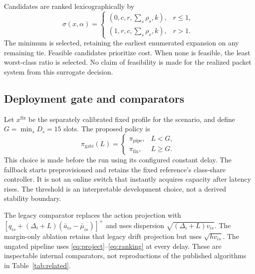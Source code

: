 \documentclass[10pt,a4paper]{article}
\begin{document}
Candidates are ranked lexicographically by
\begin{equation}
 \sigma(x,\alpha)=
 \begin{cases}
 (0,c,r,\sum_s\rho_s,k), & r\le1,\\
 (1,r,c,\sum_s\rho_s,k), & r>1.
 \end{cases}\label{eq:ranking}
\end{equation}
The minimum is selected, retaining the earliest enumerated expansion on any
remaining tie. Feasible candidates prioritize cost. When none is feasible,
the least worst-class ratio is selected. No claim of feasibility is made for
the realized packet system from this surrogate decision.

\subsection{Deployment gate and comparators}
Let $x^{\mathrm{fix}}$ be the separately calibrated fixed profile for the
scenario, and define $G=\min_s D_s=15$ slots. The proposed policy is
\begin{equation}
 \pi_{\mathrm{gate}}(L)=
 \begin{cases}
 \pi_{\mathrm{pipe}}, & L<G,\\
 \pi_{\mathrm{fix}}, & L\ge G.
 \end{cases}\label{eq:gate}
\end{equation}
This choice is made before the run using its configured constant delay. The
fallback starts preprovisioned and retains the fixed reference's class-share
controller. It is not an online switch that instantly acquires capacity after
latency rises. The threshold is an interpretable development choice, not a
derived stability boundary.

The legacy comparator replaces the action projection with
$[q_{is}+(\Delta_i+L)(\bar a_{is}-\bar\mu_{is})]^+$ and uses dispersion
$\sqrt{(\Delta_i+L)v_{is}}$. The margin-only ablation retains that legacy drift
projection but uses $\sqrt{h v_{is}}$. The ungated pipeline uses
\eqref{eq:project}--\eqref{eq:ranking} at every delay. These are inspectable
internal comparators, not reproductions of the published algorithms in
Table~\ref{tab:related}.
\end{document}
